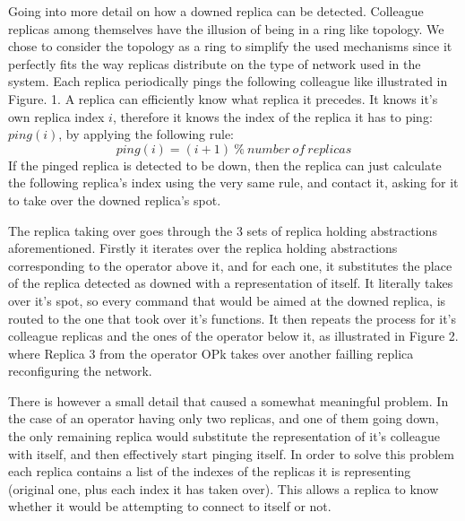 \documentclass[times, 10pt,twocolumn]{article}
\begin{document}
Going into more detail on how a downed replica can be detected.  Colleague
replicas among themselves have the illusion of being in a ring like
topology. We chose to consider the topology as a ring to simplify the used mechanisms since it perfectly fits the way replicas distribute on the type of network used in the system. Each replica periodically pings the following colleague like
illustrated in Figure. 1. A replica can efficiently know what replica it
precedes. It knows it's own replica index $i$, therefore it knows the index
of the replica it has to ping: $ping(i)$, by applying the following rule:
\[ping(i) = (i + 1)\ \%\ number\ of\ replicas\] If the pinged replica is
detected to be down, then the replica can just calculate the following
replica's index using the very same rule, and contact it, asking for it to
take over the downed replica's spot. 


The replica taking over goes through the 3 sets of replica holding
abstractions aforementioned. Firstly it iterates over the replica
holding abstractions corresponding to the operator above it, and for each
one, it substitutes the place of the replica detected as downed with a
representation of itself. It literally takes over it's spot, so every
command that would be aimed at the downed replica, is routed to the one
that took over it's functions. It then repeats the process for it's
colleague replicas and the ones of the operator below it, as illustrated
in Figure 2. where Replica 3 from the operator OPk takes over another
failling replica reconfiguring the network.


There is however a small detail that caused a somewhat meaningful problem.
In the case of an operator having only two replicas, and one of them going
down, the only remaining replica would substitute the representation of
it's colleague with itself, and then effectively start pinging itself.
In order to solve this problem each replica contains a list of the indexes
of the replicas it is representing (original one, plus each index it has taken over). This allows a replica to know whether
it would be attempting to connect to itself or not.
\end{document}
